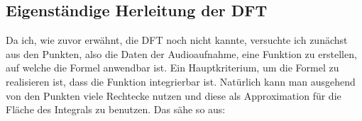 \documentclass[a4paper,12pt]{article}
\theoremstyle{definition}
\theoremstyle{remark}
\begin{document}
\subsection{Eigenständige Herleitung der DFT}
Da ich, wie zuvor erwähnt, die DFT noch nicht kannte, versuchte ich zunächst aus den Punkten, 
also die Daten der Audioaufnahme, eine Funktion zu erstellen, auf welche die Formel anwendbar 
ist. Ein Hauptkriterium, um die Formel zu realisieren ist, dass die Funktion integrierbar ist. 
Natürlich kann man ausgehend von den Punkten viele Rechtecke nutzen und diese als Approximation 
für die Fläche des Integrals zu benutzen. Das sähe so aus:

\begin{figure}[h!]
\centering
{}
\end{figure}
\end{document}
